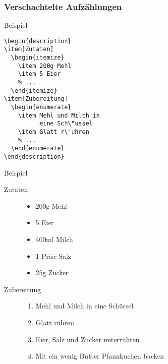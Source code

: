 \begin{frame}[c,fragile]
\end{frame}

\begin{frame}
\frametitle{Verschachtelte Aufz\"ahlungen}

\begin{minipage}[t]{0.48\textwidth}
\begin{block}{Beispiel}
\begin{verbatim}
\begin{description}
\item[Zutaten]
  \begin{itemize}
    \item 200g Mehl
    \item 5 Eier
    % ...
  \end{itemize}
\item[Zubereitung]
  \begin{enumerate}
    \item Mehl und Milch in
          eine Sch\"ussel
    \item Glatt r\"uhren
    % ...
  \end{enumerate}
\end{description}
\end{verbatim}
\end{block}
\end{minipage}
\hfill
\begin{minipage}[t]{0.48\textwidth}
\begin{block}{Beispiel}
\begin{description}
\item[Zutaten]
  \begin{itemize}
    \item 200g Mehl
    \item 5 Eier
    \item 400ml Milch
    \item 1 Prise Salz
    \item 25g Zucker
  \end{itemize}
\item[Zubereitung]
  \begin{enumerate}
    \item Mehl und Milch in
          eine Sch\"ussel
    \item Glatt r\"uhren
    \item Eier, Salz und Zucker unterr\"uhren
    \item Mit ein wenig Butter Pfannkuchen backen
  \end{enumerate}
\end{description}
\end{block}
\end{minipage}

\end{frame}

